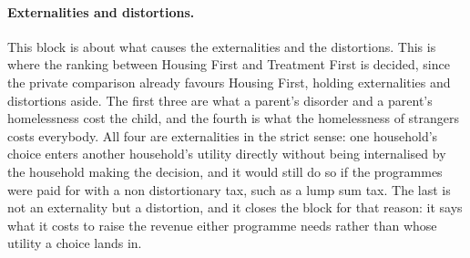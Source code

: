 \documentclass[10pt]{article}
\begin{document}
\paragraph{Externalities and distortions.} This block is about what causes the
externalities and the distortions. This is where the ranking between Housing
First and Treatment First is decided, since the private comparison already favours
Housing First, holding externalities and distortions aside.
The first three are what a parent's disorder and a
parent's homelessness cost the child, and the fourth is what the
homelessness of strangers costs everybody. All four are externalities in the strict
sense: one household's choice enters another household's utility directly without
being internalised by the household making the decision, and it
would still do so if the programmes were paid for with a non distortionary tax, such
as a lump sum tax. The
last is not an externality but a distortion, and it closes the block for that
reason: it says what it costs to raise the revenue either programme needs rather
than whose utility a choice lands in.
\end{document}

